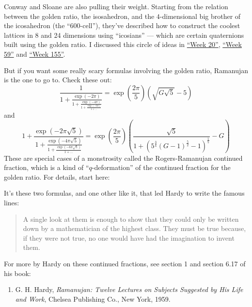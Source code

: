 \documentclass{article}
\def\tightlist{}
\renewcommand{\texttt}[1]{%
  \begingroup
  \ttfamily
  \begingroup\lccode`~=`/\lowercase{\endgroup\def~}{/\discretionary{}{}{}}%
  \begingroup\lccode`~=`[\lowercase{\endgroup\def~}{[\discretionary{}{}{}}%
  \begingroup\lccode`~=`.\lowercase{\endgroup\def~}{.\discretionary{}{}{}}%
  \catcode`/=\active\catcode`[=\active\catcode`.=\active
  \scantokens{#1\noexpand}%
  \endgroup
}
\begin{document}
Conway and Sloane are also pulling their weight. Starting from the
relation between the golden ratio, the isosahedron, and the
\(4\)-dimensional big brother of the icosahedron (the ``600-cell''),
they've described how to construct the coolest lattices in 8 and 24
dimensions using ``icosians'' --- which are certain quaternions built
using the golden ratio. I discussed this circle of ideas in
\protect\hyperlink{week20}{``Week 20''},
\protect\hyperlink{week59}{``Week 59''} and
\protect\hyperlink{week155}{``Week 155''}.

But if you want some really scary formulas involving the golden ratio,
Ramanujan is the one to go to. Check these out:
\[\frac{1}{1 + \frac{\exp(-2\pi)}{1 + \frac{\exp(-4\pi)}{1 + \frac{\exp(-6\pi)}{1 + \ldots}}}} = \exp\left(\frac{2\pi}{5}\right)\left(\sqrt{G\sqrt{5}}-5\right)\]
and
\[1 + \frac{\exp(-2\pi\sqrt{5})}{1 + \frac{\exp(-4\pi\sqrt{5})}{1 + \frac{\exp(-6\pi\sqrt{5})}{1 + \ldots}}} = \exp\left(\frac{2\pi}{5}\right)\left(\frac{\sqrt{5}}{1+(5^\frac34(G-1)^\frac52-1)^\frac15}-G\right)\]
These are special cases of a monstrosity called the Rogers-Ramanujan
continued fraction, which is a kind of ``\(q\)-deformation'' of the
continued fraction for the golden ratio. For details, start here:


It's these two formulas, and one other like it, that led Hardy to write
the famous lines:

\begin{quote}
A single look at them is enough to show that they could only be written
down by a mathematician of the highest class. They must be true because,
if they were not true, no one would have had the imagination to invent
them.
\end{quote}

For more by Hardy on these continued fractions, see section 1 and
section 6.17 of his book:

\begin{enumerate}
\def\labelenumi{\arabic{enumi})}
\setcounter{enumi}{12}
\tightlist
\item
  G. H. Hardy, \emph{Ramanujan: Twelve Lectures on Subjects Suggested by
  His Life and Work}, Chelsea Publishing Co., New York, 1959.
\end{enumerate}
\end{document}
